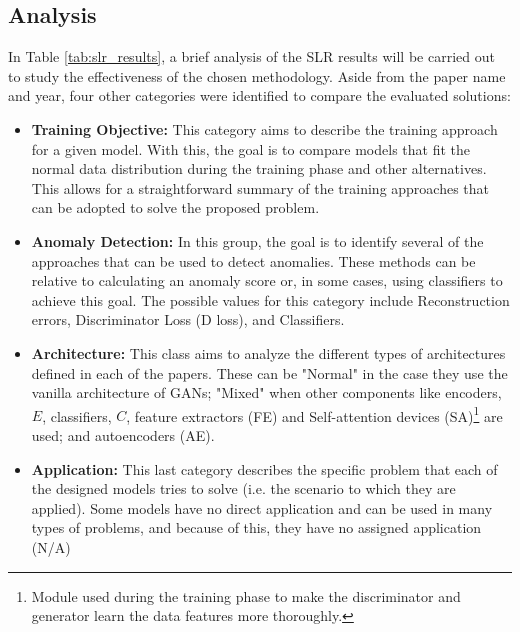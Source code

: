 \subsection{Analysis}\label{sec:gan_res_analysis}
In Table \ref{tab:slr_results}, a brief analysis of the SLR results will be carried out to study the effectiveness of the chosen methodology. Aside from the paper name and year, four other categories were identified to compare the evaluated solutions:

\begin{itemize}
    \item \textbf{Training Objective:} This category aims to describe the training approach for a given model. With this, the goal is to compare models that fit the normal data distribution during the training phase and other alternatives. This allows for a straightforward summary of the training approaches that can be adopted to solve the proposed problem.

    \item \textbf{Anomaly Detection:} In this group, the goal is to identify several of the approaches that can be used to detect anomalies. These methods can be relative to calculating an anomaly score or, in some cases, using classifiers to achieve this goal. The possible values for this category include Reconstruction errors, Discriminator Loss (D loss), and Classifiers.

    \item \textbf{Architecture:} This class aims to analyze the different types of architectures defined in each of the papers. These can be "Normal" in the case they use the vanilla architecture of GANs;  "Mixed" when other components like encoders, $E$, classifiers, $C$, feature extractors (FE) and Self-attention devices (SA)\footnote{Module used during the training phase to make the discriminator and generator learn the data features more thoroughly.} are used; and autoencoders (AE).

    \item \textbf{Application:} This last category describes the specific problem that each of the designed models tries to solve (i.e. the scenario to which they are applied). Some models have no direct application and can be used in many types of problems, and because of this, they have no assigned application (N/A)
\end{itemize}




